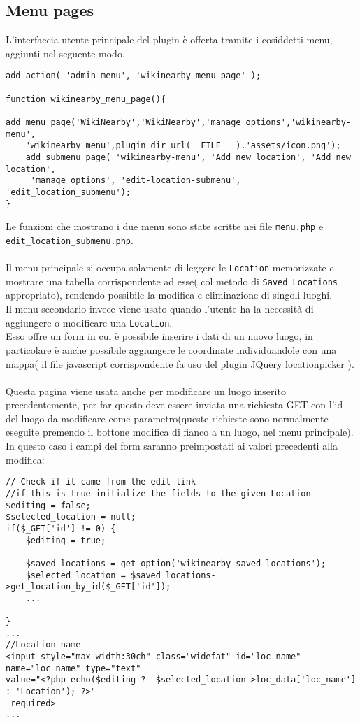 \subsection*{Menu pages}
L'interfaccia utente principale del plugin è offerta tramite i cosiddetti menu\cite{menus}, aggiunti nel seguente modo.\\
\begin{lstlisting}
add_action( 'admin_menu', 'wikinearby_menu_page' );

function wikinearby_menu_page(){
    add_menu_page('WikiNearby','WikiNearby','manage_options','wikinearby-menu',
    'wikinearby_menu',plugin_dir_url(__FILE__ ).'assets/icon.png');
    add_submenu_page( 'wikinearby-menu', 'Add new location', 'Add new location',
     'manage_options', 'edit-location-submenu', 'edit_location_submenu');
}
\end{lstlisting}
Le funzioni che mostrano i due menu sono state scritte nei file \texttt{menu.php} e \\ \texttt{edit\_location\_submenu.php}.\\ \\
Il menu principale si occupa solamente di leggere le \texttt{Location} memorizzate e mostrare una tabella corrispondente ad esse( col metodo di \texttt{Saved\_Locations} appropriato), rendendo possibile la modifica e eliminazione di singoli luoghi.\\
Il menu secondario invece viene usato quando l'utente ha la necessità di aggiungere o modificare una \texttt{Location}.\\
Esso offre un form in cui è possibile inserire i dati di un nuovo luogo, in particolare è anche possibile aggiungere le coordinate individuandole con una mappa( il file javascript corrispondente fa uso del plugin JQuery locationpicker \cite{locpicker}).\\\\
Questa pagina viene usata anche per modificare un luogo inserito precedentemente, per far questo deve essere inviata una richiesta GET con l'id del luogo da modificare come parametro(queste richieste sono normalmente eseguite premendo il bottone modifica di fianco a un luogo, nel menu principale).\\
In questo caso i campi del form saranno preimpostati ai valori precedenti alla modifica:

\begin{lstlisting}
// Check if it came from the edit link
//if this is true initialize the fields to the given Location
$editing = false;
$selected_location = null;
if($_GET['id'] != 0) {
	$editing = true;
		
	$saved_locations = get_option('wikinearby_saved_locations');
	$selected_location = $saved_locations->get_location_by_id($_GET['id']);
	...
		
}
...
//Location name
<input style="max-width:30ch" class="widefat" id="loc_name" name="loc_name" type="text" 
value="<?php echo($editing ?  $selected_location->loc_data['loc_name'] : 'Location'); ?>"
 required>
...
\end{lstlisting}
